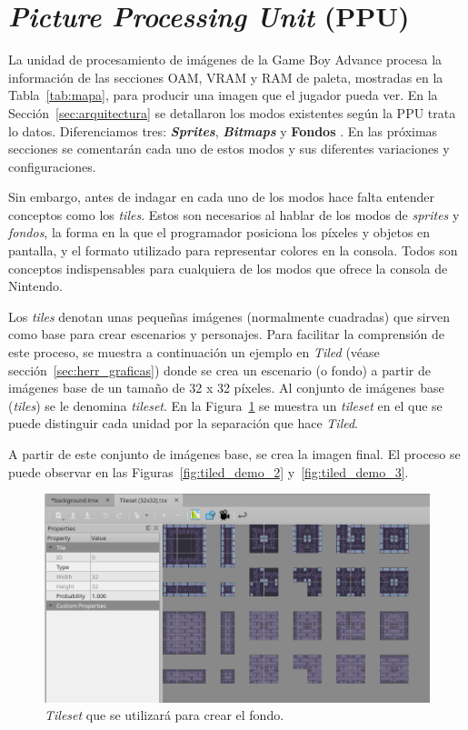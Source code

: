 \section{\textit{Picture Processing Unit} (PPU)}\label{sec:ppu}

La unidad de procesamiento de imágenes de la Game Boy Advance procesa la información de las secciones OAM, VRAM y RAM de paleta, mostradas en la Tabla~\ref{tab:mapa}, para producir una imagen que el jugador pueda ver. En la Sección~\ref{sec:arquitectura} se detallaron los modos existentes según la PPU trata lo datos. Diferenciamos tres: \textbf{\textit{Sprites}}, \textbf{\textit{Bitmaps}} y \textbf{Fondos} \cite{bib:gba_manual}. En las próximas secciones se comentarán cada uno de estos modos y sus diferentes variaciones y configuraciones.

Sin embargo, antes de indagar en cada uno de los modos hace falta entender conceptos como los \textit{tiles}. Estos son necesarios al hablar de los modos de \textit{sprites} y \textit{fondos}, la forma en la que el programador posiciona los píxeles y objetos en pantalla, y el formato utilizado para representar colores en la consola. Todos son conceptos indispensables para cualquiera de los modos que ofrece la consola de Nintendo.

Los \textit{tiles} denotan unas pequeñas imágenes (normalmente cuadradas) que sirven como base para crear escenarios y personajes. Para facilitar la comprensión de este proceso, se muestra a continuación un ejemplo en \textit{Tiled} (véase sección~\ref{sec:herr_graficas}) donde se crea un escenario (o fondo) a partir de imágenes base de un tamaño de 32 x 32 píxeles. Al conjunto de imágenes base (\textit{tiles}) se le denomina \textit{tileset}. En la Figura~\ref{fig:tiled_demo_1} se muestra un \textit{tileset} en el que se puede distinguir cada unidad por la separación que hace \textit{Tiled}.

A partir de este conjunto de imágenes base, se crea la imagen final. El proceso se puede observar en las Figuras~\ref{fig:tiled_demo_2} y~\ref{fig:tiled_demo_3}.

\begin{figure}[h]
	\centering
	\includegraphics[width=.7\textwidth]{capitulos/capitulo3/tiled_demo_1.png}
	\caption{\textit{Tileset} que se utilizará para crear el fondo.}
	\label{fig:tiled_demo_1}
\end{figure}

